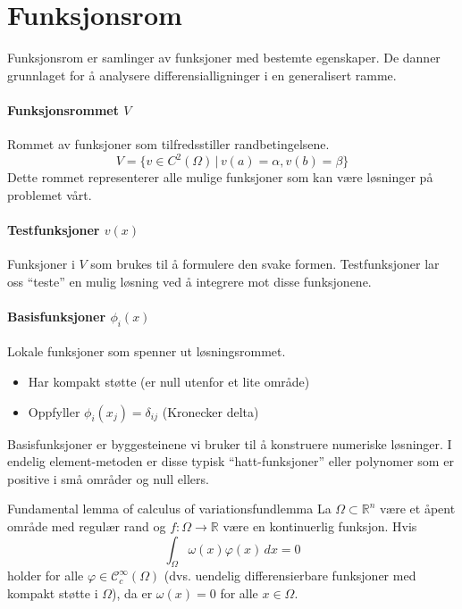 \section{Funksjonsrom}
Funksjonsrom er samlinger av funksjoner med bestemte egenskaper. De danner grunnlaget for å analysere differensialligninger i en generalisert ramme.

\paragraph{Funksjonsrommet \(V\)} Rommet av funksjoner som tilfredsstiller randbetingelsene.
\[ V = \{ v \in C^2(\Omega) \, | \, v(a) = \alpha, v(b) = \beta \} \]
Dette rommet representerer alle mulige funksjoner som kan være løsninger på problemet vårt.

\paragraph{Testfunksjoner \(v(x)\)} Funksjoner i \(V\) som brukes til å formulere den svake formen.
Testfunksjoner lar oss \enquote{teste} en mulig løsning ved å integrere mot disse funksjonene.

\paragraph{Basisfunksjoner \(\phi_i(x)\)} Lokale funksjoner som spenner ut løsningsrommet.
\begin{itemize}
	\item Har kompakt støtte (er null utenfor et lite område)
	\item Oppfyller \(\phi_i(x_j) = \delta_{ij}\) (Kronecker delta)
\end{itemize}

Basisfunksjoner er byggesteinene vi bruker til å konstruere numeriske løsninger. I endelig element-metoden er disse typisk \enquote{hatt-funksjoner} eller polynomer som er positive i små områder og null ellers.

\begin{lemma}{Fundamental lemma of calculus of variations}{fundlemma}
	La $\Omega \subset \mathbb{R}^n$ være et åpent område med regulær rand og $f: \Omega \rightarrow \mathbb{R}$ være en kontinuerlig funksjon.
	Hvis
	\begin{equation}
		\int_{\Omega} \omega(x) \varphi(x) \, dx = 0
	\end{equation}
	holder for alle $\varphi \in \mathcal{C}_c^{\infty}(\Omega)$ (dvs. uendelig differensierbare funksjoner med kompakt støtte i $\Omega$), da er $\omega(x) = 0$ for alle $x \in \Omega$.
\end{lemma}

